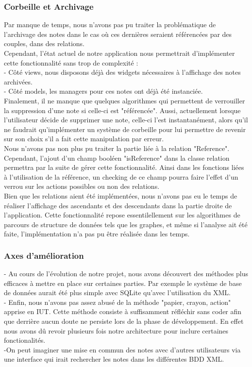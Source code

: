\documentclass[a4paper]{report}
\begin{document}
\subsubsection{Corbeille et Archivage}
Par manque de temps, nous n'avons pas pu traiter la problématique de l'archivage des notes dans le cas où ces dernières seraient référencées par des couples, dans des relations.\\
Cependant, l'état actuel de notre application nous permettrait d'implémenter cette fonctionnalité sans trop de complexité : \\
- Côté views, nous disposons déjà des widgets nécessaires à l'affichage des notes archivées. \\
- Côté models, les managers pour ces notes ont déjà été instanciée.\\
Finalement, il ne manque que quelques algorithmes qui permettent de verrouiller la suppression d'une note si celle-ci est "référencée". Aussi, actuellement lorsque l'utilisateur décide de supprimer une note, celle-ci l'est instantanément, alors qu'il ne faudrait qu'implémenter un système de corbeille pour lui permettre de revenir sur son choix s'il a fait cette manipulation par erreur.\\
Nous n'avons pas non plus pu traiter la partie liée à la relation "Reference".\\ Cependant, l'ajout d'un champ booléen "isReference" dans la classe relation permettra par la suite de gérer cette fonctionnalité. Ainsi dans les fonctions liées à l'utilisation de la référence, un checking de ce champ pourra faire l'effet d'un verrou sur les actions possibles ou non des relations.\\
Bien que les relations aient été implémentées, nous n'avons pas eu le temps de réaliser l'affichage des ascendants et des descendants dans la partie droite de l'application. Cette fonctionnalité repose essentilellement sur les algorithmes de parcours de structure de données tels que les graphes, et même si l'analyse ait été faite, l'implémentation n'a pas pu être réalisée dans les temps.

\subsubsection{Axes d'amélioration}
- Au cours de l'évolution de notre projet, nous avons découvert des méthodes plus efficaces à mettre en place sur certaines parties. Par exemple le système de base de données aurait été plus simple avec SQLite qu'avec l'utilisation du XML. \\
- Enfin, nous n'avons pas assez abusé de la méthode "papier, crayon, action" apprise en IUT. Cette méthode consiste à suffisamment réfléchir sans coder afin que derrière aucun doute ne persiste lors de la phase de développement. En effet nous avons dû revoir plusieurs fois notre architecture pour inclure certaines fonctionalités.\\
-On peut imaginer une mise en commun des notes avec d'autres utilisateurs via une interface qui irait rechercher les notes dans les différentes BDD XML.
\end{document}
